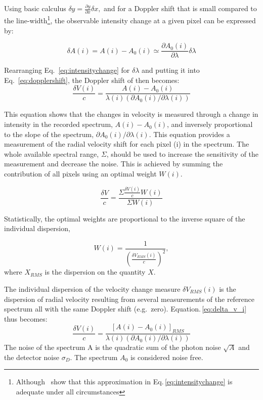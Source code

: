 Using basic calculus \(\delta y = \frac{\partial y}{\partial x} \delta x,  \nonumber\) and for a Doppler shift that is small compared to the line-width\footnote{Although~\citet{Connes1985} show that this approximation in Eq.\,\ref{eq:intensitychange} is adequate under all circumstances}, the observable intensity change at a given pixel can be expressed by:

\begin{equation}
\delta A(i) = A(i) - A_0(i) \simeq \frac{\partial A_0(i)}{\partial \lambda} \delta \lambda
\label{eq:intensitychange}
\end{equation}

Rearranging Eq.~\ref{eq:intensitychange} for \(\delta \lambda\) and putting it into Eq.~\ref{eq:dopplershift}, the Doppler shift of then becomes:
\begin{equation}
    \frac{\delta V(i)}{c} = \frac{A(i) - A_0(i) }{\lambda(i) (\partial A_0(i)/\partial \lambda(i))} \label{eq:delta_v_i}
\end{equation}

This equation shows that the changes in velocity is measured through a change in intensity in the recorded spectrum, \(A(i)-A_0(i)\), and inversely proportional to the slope of the spectrum, \({\partial A_0(i)}/{\partial \lambda(i)}\).
This equation provides a measurement of the radial velocity shift for each pixel (i) in the spectrum. The whole available spectral range, \(\Sigma\), should be used to increase the sensitivity of the measurement and decrease the noise. This is achieved by summing the contribution of all pixels using an optimal weight \(W(i)\).

\begin{equation}
\frac{\delta V}{c} = \frac{\Sigma{\frac{\delta V(i)}{c}W(i)}}{\Sigma {W(i)}}
\end{equation}

Statistically, the optimal weights are proportional to the inverse square of the individual dispersion,


\begin{equation}
W(i) = \frac{1}{{\left(\frac{\delta V_{RMS}(i)}{c}\right)}^2},  \label{eq:weights}
\end{equation}
where \(X_{RMS}\) is the dispersion on the quantity \(X\).


The individual dispersion of the velocity change measure \(\delta V_{RMS}(i)\) is the dispersion of radial velocity resulting from several measurements of the reference spectrum all with the same Doppler shift (e.g.\ zero). Equation.\,\ref{eq:delta_v_i} thus becomes:
\begin{equation}
    \frac{\delta V(i)}{c} = \frac{{[A(i) - A_0(i)]}_{RMS} }{\lambda(i) (\partial A_0(i)/\partial \lambda(i))} \label{eq:delta_v_i_rms}
\end{equation}
The noise of the spectrum A is the quadratic sum of the photon noise \(\sqrt{A}\) and the detector noise \(\sigma_D\). The spectrum \(A_0\) is considered noise free.

